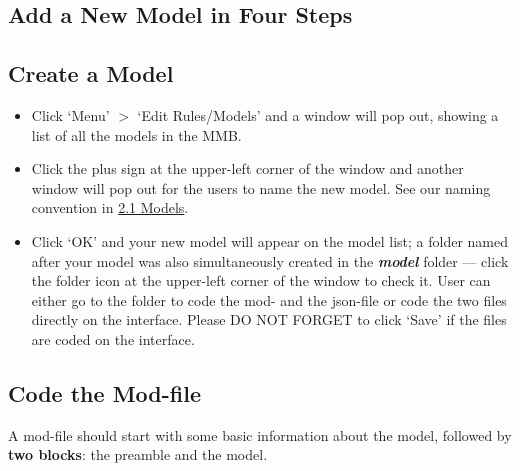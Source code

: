\documentclass[10pt,a4paper]{article}
\begin{document}
\begin{flushleft}
\section{Add a New Model in Four Steps}
\end{flushleft}
\medskip

\subsection{Create a Model}
\medskip

\begin{itemize}
\item Click ‘Menu’ $>$ ‘Edit Rules/Models’ and a window will pop out, showing a list of all the models in the MMB.

\item Click the plus sign at the upper-left corner of the window and another window will pop out for the users to name the new model. See our naming convention in \hyperref[sec:Models]{2.1 Models}.

\item Click ‘OK’ and your new model will appear on the model list; a folder named after your model was also simultaneously created in the \textit{\textbf{model}} folder — click the folder icon at the upper-left corner of the window to check it. User can either go to the folder to code the mod- and the json-file or code the two files directly on the interface. Please DO NOT FORGET to click ‘Save’ if the files are coded on the interface.
\end{itemize}

\subsection{Code the Mod-file}
\bigskip

A mod-file should start with some basic information about the model, followed by \textbf{two blocks}: the preamble and the model.
\end{document}
